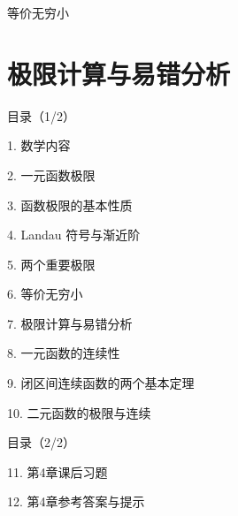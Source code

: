 \documentclass[aspectratio=169,10pt,fontset=fandol]{ctexbeamer}
\begin{document}
\begin{frame}[t,fragile]{等价无穷小}
\normalsize
{\normalsize






\iffalse




}
\end{frame}
\section{极限计算与易错分析}
\begin{frame}[t,fragile]{目录（1/2）}
\normalsize
{\color{black}\normalsize 1. 数学内容\par}\vspace{0.3em}
{\color{black}\normalsize 2. 一元函数极限\par}\vspace{0.3em}
{\color{black}\normalsize 3. 函数极限的基本性质\par}\vspace{0.3em}
{\color{black}\normalsize 4. Landau 符号与渐近阶\par}\vspace{0.3em}
{\color{black}\normalsize 5. 两个重要极限\par}\vspace{0.3em}
{\color{black}\normalsize 6. 等价无穷小\par}\vspace{0.3em}
{\color{blue}\normalsize 7. 极限计算与易错分析\par}\vspace{0.3em}
{\color{gray!40}\normalsize 8. 一元函数的连续性\par}\vspace{0.3em}
{\color{gray!40}\normalsize 9. 闭区间连续函数的两个基本定理\par}\vspace{0.3em}
{\color{gray!40}\normalsize 10. 二元函数的极限与连续\par}\vspace{0.3em}
\end{frame}
\begin{frame}[t,fragile]{目录（2/2）}
\normalsize
{\color{gray!40}\normalsize 11. 第4章课后习题\par}\vspace{0.3em}
{\color{gray!40}\normalsize 12. 第4章参考答案与提示\par}\vspace{0.3em}
\end{frame}
\end{document}

